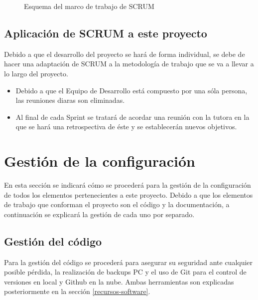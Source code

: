 \begin{figure}[H]
    \caption{Esquema del marco de trabajo de SCRUM}
    \label{fig:scrum-esquema}
\end{figure}

\subsection{Aplicación de SCRUM a este proyecto}
Debido a que el desarrollo del proyecto se hará de forma individual, se debe de hacer una adaptación de SCRUM a la metodología de trabajo que se va a llevar a lo largo del proyecto.

\begin{itemize}
    \item Debido a que el Equipo de Desarrollo está compuesto por una sóla persona, las reuniones diaras son eliminadas.
    \item Al final de cada Sprint se tratará de acordar una reunión con la tutora en la que se hará una retrospectiva de éste y se establecerán nuevos objetivos.
\end{itemize}

\section{Gestión de la configuración}
En esta sección se indicará cómo se procederá para la gestión de la configuración de todos los elementos pertenecientes a este proyecto. Debido a que los elementos de trabajo que conforman el proyecto son el código y la documentación, a continuación se explicará la gestión de cada uno por separado.

\subsection{Gestión del código}
Para la gestión del código se procederá para asegurar su seguridad ante cualquier posible pérdida, la realización de backups PC y el uso de Git para el control de versiones en local y Github en la nube. Ambas herramientas son explicadas posteriormente en la sección \ref{recursos-software}. \bigskip

